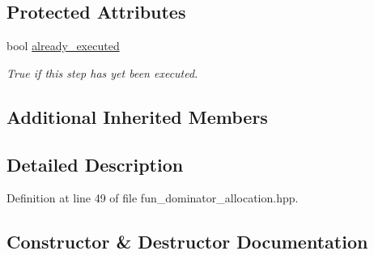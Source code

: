 \subsection*{Protected Attributes}
\begin{DoxyCompactItemize}
\item 
bool \hyperlink{classfun__dominator__allocation_a4d4fbf7f9b5466a2ae199cce16ee1b19}{already\+\_\+executed}
\begin{DoxyCompactList}\small\item\em True if this step has yet been executed. \end{DoxyCompactList}\end{DoxyCompactItemize}
\subsection*{Additional Inherited Members}


\subsection{Detailed Description}


Definition at line 49 of file fun\+\_\+dominator\+\_\+allocation.\+hpp.



\subsection{Constructor \& Destructor Documentation}
\mbox{\label{classfun__dominator__allocation_a65d6cb6a0b0d37997685fa56c234ac75}} 
